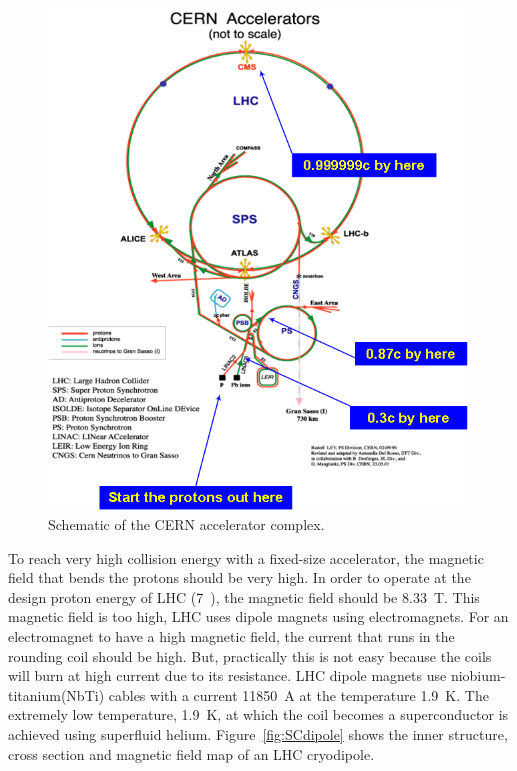 %
\begin{figure}[ht!] 
\centering 
\includegraphics[width=0.99\textwidth]{figures/Cern-complex.png}
\caption{Schematic of the CERN accelerator complex.} 
\label{fig:cerncomplex} 
\end{figure} 


To reach very high collision energy with a fixed-size accelerator, 
the magnetic field that bends the protons should be very high. 
In order to operate at the design proton energy of LHC (7~\TeV), 
the magnetic field should be 8.33~T. This magnetic field is too high, 
LHC uses dipole magnets using electromagnets. For an electromagnet 
to have a high magnetic field, the current that runs in the rounding coil 
should be high. But, practically this is not easy because the coils will burn 
at high current due to its resistance. LHC dipole magnets use 
niobium-titanium(NbTi) cables with a current 11850~A at the temperature 1.9~K.
The extremely low temperature, 1.9~K, at which the coil becomes a superconductor
is achieved using superfluid helium.  
Figure~\ref{fig:SCdipole} shows the inner structure, cross section and magnetic field map of
an LHC cryodipole.

